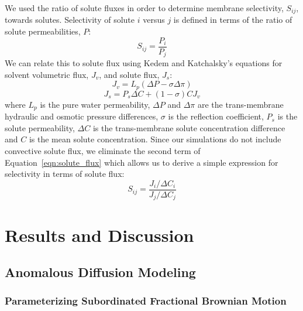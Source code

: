 \documentclass[journal=ancac3,manuscript=article,layout=twocolumn]{achemso}
\begin{document}
  We used the ratio of solute fluxes in order to determine membrane
  selectivity, $S_{ij}$, towards solutes. Selectivity of solute $i$ versus $j$
  is defined in terms of the ratio of solute permeabilities,
  $P$:~\cite{guo_pervaporation_2004}
  \begin{equation}
  S_{ij} = \frac{P_i}{P_j}
  \end{equation}
  We can relate this to solute flux using Kedem and Katchalsky's equations for
  solvent volumetric flux, $J_v$, and solute flux,
  $J_s$:~\cite{kedem_permeability_1963,al-zoubi_rejection_2007}
  \begin{equation}
  J_v = L_p(\Delta P - \sigma\Delta \pi)
  \end{equation} 
  \begin{equation}
  J_s = P_s \Delta C + (1 - \sigma)CJ_v
  \label{eqn:solute_flux}
  \end{equation}
  where $L_p$ is the pure water permeability, $\Delta P$ and $\Delta \pi$ are
  the trans-membrane hydraulic and osmotic pressure differences, $\sigma$ is
  the reflection coefficient, $P_s$ is the solute permeability, $\Delta C$ is
  the trans-membrane solute concentration difference and $C$ is the mean solute
  concentration. Since our simulations do not include convective solute flux,
  we eliminate the second term of Equation~\ref{eqn:solute_flux} which allows
  us to derive a simple expression for selectivity in terms of solute flux:
  \begin{equation}
  S_{ij} = \frac{J_i / \Delta C_i}{J_j / \Delta C_j}
  \label{eqn:selectivity}
  \end{equation}
  
  \section{Results and Discussion}
  
  \subsection{Anomalous Diffusion Modeling}\label{section:sFBM}
  
  \subsubsection{Parameterizing Subordinated Fractional Brownian Motion}\label{section:AD_parameterization}
\end{document}
